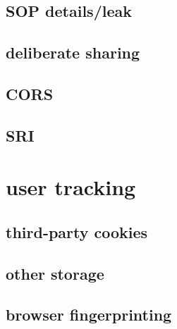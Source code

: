 \subsection{SOP details/leak}


\subsection{deliberate sharing}


\subsection{CORS}

\subsection{SRI}


\section{user tracking}


\subsection{third-party cookies}



\subsection{other storage}


\subsection{browser fingerprinting}


%
